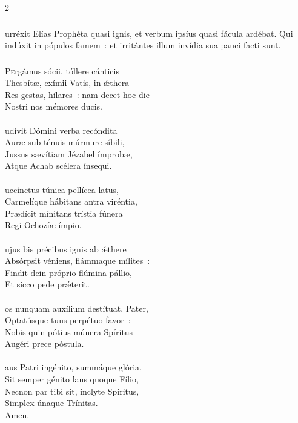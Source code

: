 \documentclass[9pt,twoside]{extarticle}
\begin{document}
\begin{multicols}{2}
{\subsubsection*{}
urréxit Elías Prophéta quasi ignis, et verbum ipsíus quasi fácula ardébat. Qui indúxit in pópulos famem~: et irritántes illum invídia sua pauci facti sunt.

\subsubsection*{\center {}}
\lettrine{P}ergámus sócii, tóllere cánticis\\
Thesbítæ, exímii Vatis, in ǽthera\\
Res gestas, hílares~: nam decet hoc die\\
Nostri nos mémores ducis.\\
\\
udívit Dómini verba recóndita\\
Auræ sub ténuis múrmure síbili,\\
Jussus sævítiam Jézabel ímprobæ,\\
Atque Achab scélera ínsequi.\\
\\
uccínctus túnica pellícea latus,\\
Carmelíque hábitans antra viréntia,\\
Prædícit mínitans trístia fúnera\\
Regi Ochozíæ ímpio.\\
\\
ujus bis précibus ignis ab ǽthere\\
Absórpsit véniens, flámmaque mílites~:\\
Findit dein próprio flúmina pállio,\\
Et sicco pede prǽterit.\\
\\
os nunquam auxílium destítuat, Pater,\\
Optatúsque tuus perpétuo favor~:\\
Nobis quin pótius múnera Spíritus\\
Augéri prece póstula.\\
\\
aus Patri ingénito, summáque glória,\\
Sit semper génito laus quoque Fílio,\\
Necnon par tibi sit, ínclyte Spíritus,\\
Simplex únaque Trínitas.\\
Amen.

}
\end{multicols}
\end{document}
